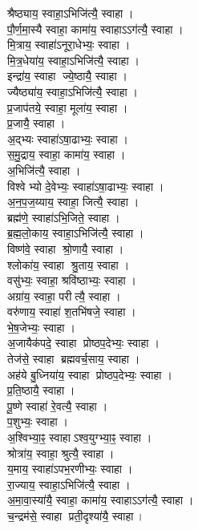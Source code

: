 श्रैष्ठ्याय॒ स्वाहा॒ऽभिजि॑त्यै॒ स्वाहा।\\
पौ॒र्ण॒मा॒स्यै स्वाहा॒ कामा॑य॒ स्वाहाऽऽग॑त्यै॒ स्वाहा।\\
मि॒त्राय॒ स्वाहा॑ऽनूरा॒धेभ्यः॒ स्वाहा।\\
मि॒त्र॒धेया॑य॒ स्वाहा॒ऽभिजि॑त्यै॒ स्वाहा।\\
इन्द्रा॑य॒ स्वाहा ज्ये॒ष्ठायै॒ स्वाहा।\\
ज्यैष्ठ्या॑य॒ स्वाहा॒ऽभिजि॑त्यै॒ स्वाहा।\\
प्र॒जाप॑तये॒ स्वाहा॒ मूला॑य॒ स्वाहा।\\
प्र॒जायै॒ स्वाहा।\\
अ॒द्भ्यः स्वाहा॑ऽषा॒ढाभ्यः॒ स्वाहा।\\
स॒मु॒द्राय॒ स्वाहा॒ कामा॑य॒ स्वाहा।\\
अ॒भिजि॑त्यै॒ स्वाहा।\\
विश्वेभ्यो दे॒वेभ्यः॒ स्वाहा॑ऽषा॒ढाभ्यः॒ स्वाहा।\\
अ॒न॒प॒ज॒य्याय॒ स्वाहा॒ जित्यै॒ स्वाहा।\\
ब्रह्म॑णे॒ स्वाहा॑ऽभि॒जिते॒ स्वाहा।\\
ब्र॒ह्म॒लो॒काय॒ स्वाहा॒ऽभिजि॑त्यै॒ स्वाहा।\\
विष्ण॑वे॒ स्वाहा श्रो॒णायै॒ स्वाहा।\\
श्लोका॑य॒ स्वाहा श्रु॒ताय॒ स्वाहा।\\
वसु॑भ्यः॒ स्वाहा॒ श्रवि॑ष्ठाभ्यः॒ स्वाहा।\\
अग्रा॑य॒ स्वाहा॒ परीत्यै॒ स्वाहा।\\
वरु॑णाय॒ स्वाहा॑ श॒तभि॑षजे॒ स्वाहा।\\
भे॒ष॒जेभ्यः॒ स्वाहा।\\
अ॒जायैक॑पदे॒ स्वाहा प्रोष्ठप॒देभ्यः॒ स्वाहा।\\
तेज॑से॒ स्वाहा ब्रह्मवर्च॒साय॒ स्वाहा।\\
अह॑ये बु॒ध्निया॑य॒ स्वाहा प्रोष्ठप॒देभ्यः॒ स्वाहा।\\
प्र॒ति॒ष्ठायै॒ स्वाहा।\\
पू॒ष्णे स्वाहा॑ रे॒वत्यै॒ स्वाहा।\\
प॒शुभ्यः॒ स्वाहा।\\
अ॒श्विभ्या॒ꣴ॒ स्वाहाऽश्व॒युग्भ्या॒ꣴ॒ स्वाहा।\\
श्रोत्रा॑य॒ स्वाहा॒ श्रुत्यै॒ स्वाहा।\\
य॒माय॒ स्वाहा॑ऽपभ॒रणीभ्यः॒ स्वाहा।\\
रा॒ज्याय॒ स्वाहा॒ऽभिजि॑त्यै॒ स्वाहा।\\
अ॒मा॒वा॒स्या॑यै॒ स्वाहा॒ कामा॑य॒ स्वाहाऽऽग॑त्यै॒ स्वाहा।\\
च॒न्द्रम॑से॒ स्वाहा प्रती॒दृश्या॑यै॒ स्वाहा।\\
